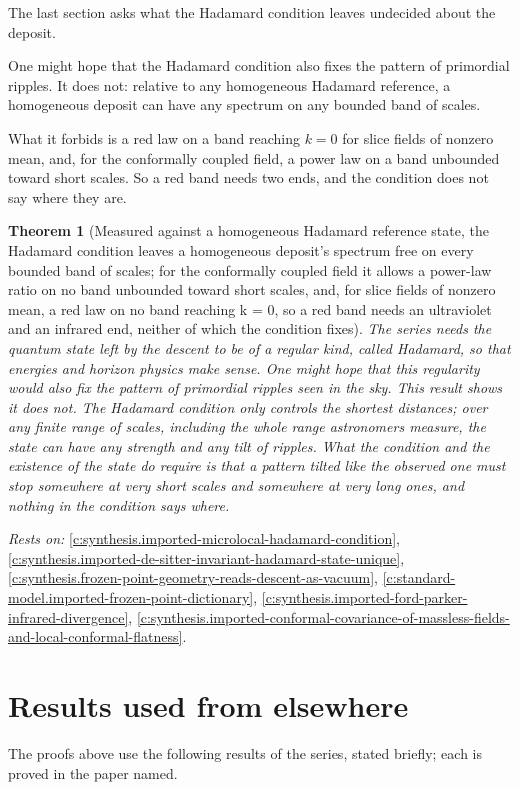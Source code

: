 \documentclass[11pt]{article}
\newtheorem{theorem}{Theorem}[section]
\theoremstyle{definition}
\theoremstyle{plain}
\begin{document}
The last section asks what the Hadamard condition leaves undecided about the deposit.

One might hope that the Hadamard condition also fixes the pattern of primordial ripples. It does not: relative to any homogeneous Hadamard reference, a homogeneous deposit can have any spectrum on any bounded band of scales.

What it forbids is a red law on a band reaching $k = 0$ for slice fields of nonzero mean, and, for the conformally coupled field, a power law on a band unbounded toward short scales. So a red band needs two ends, and the condition does not say where they are.

\begin{theorem}[Measured against a homogeneous Hadamard reference state, the Hadamard condition leaves a homogeneous deposit's spectrum free on every bounded band of scales; for the conformally coupled field it allows a power-law ratio on no band unbounded toward short scales, and, for slice fields of nonzero mean, a red law on no band reaching k = 0, so a red band needs an ultraviolet and an infrared end, neither of which the condition fixes]\label{c:synthesis.hadamard-condition-leaves-the-deposit-spectrum-free-on-bounded-bands}
The series needs the quantum state left by the descent to be of a regular kind, called Hadamard, so that energies and horizon physics make sense. One might hope that this regularity would also fix the pattern of primordial ripples seen in the sky. This result shows it does not. The Hadamard condition only controls the shortest distances; over any finite range of scales, including the whole range astronomers measure, the state can have any strength and any tilt of ripples. What the condition and the existence of the state do require is that a pattern tilted like the observed one must stop somewhere at very short scales and somewhere at very long ones, and nothing in the condition says where.
\end{theorem}
\noindent\emph{Rests on:} \ref{c:synthesis.imported-microlocal-hadamard-condition}, \ref{c:synthesis.imported-de-sitter-invariant-hadamard-state-unique}, \ref{c:synthesis.frozen-point-geometry-reads-descent-as-vacuum}, \ref{c:standard-model.imported-frozen-point-dictionary}, \ref{c:synthesis.imported-ford-parker-infrared-divergence}, \ref{c:synthesis.imported-conformal-covariance-of-massless-fields-and-local-conformal-flatness}.

\section{Results used from elsewhere}
The proofs above use the following results of the series, stated briefly; each is proved in the paper named.
\end{document}
